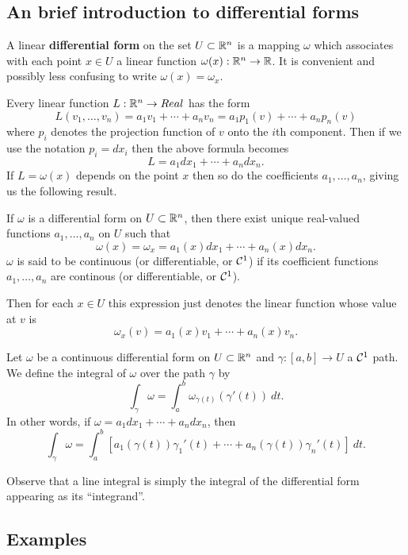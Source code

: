 \subsection{An brief introduction to differential forms}

\begin{definition}
A linear \textbf{differential form} on the set $U \subset \mathbb{R}^n$ is a mapping $\omega$ which associates with each point $x \in U$ a linear function $\omega(x): \mathbb{R}^n \to \mathbb{R}$. It is convenient and possibly less confusing to write $\omega(x) = \omega_x$.
\end{definition}

Every linear function $L: \mathbb{R}^n \to Real$ has the form
\[L(v_1, \dots, v_n) = a_1v_1 + \cdots + a_nv_n = a_1p_1(v) + \cdots + a_np_n(v)\]
where $p_i$ denotes the projection function of $v$ onto the $i$th component. Then if we use the notation $p_i = dx_i$ then the above formula becomes
\[L = a_1dx_1 + \cdots + a_ndx_n.\] If $L = \omega(x)$ depends on the point $x$ then so do the coefficients $a_1, \dots, a_n$, giving us the following result.

\begin{proposition}
If $\omega$ is a differential form on $U \subset \mathbb{R}^n$, then there exist unique real-valued functions $a_1, \dots, a_n$ on $U$ such that 
\[\omega(x) = \omega_x = a_1(x)dx_1 + \cdots + a_n(x)dx_n.\]
$\omega$ is said to be continuous (or differentiable, or $\mathcal{C}^{1}$) if its coefficient functions $a_1, \dots, a_n$ are continous (or differentiable, or $\mathcal{C}^{1}$). 
\end{proposition}

Then for each $x \in U$ this expression just denotes the linear function whose value at $v$ is
\[\omega_x(v) = a_1(x)v_1 + \cdots + a_n(x)v_n.\]

\begin{definition}
Let $\omega$ be a continuous differential form on $U \subset \mathbb{R}^n$ and $\gamma:[a,b] \to U$ a $\mathcal{C}^{1}$ path. We define the integral of $\omega$ over the path $\gamma$ by 
\[\int_{\gamma}\omega = \int_a^b \omega_{\gamma(t)}(\gamma'(t))~dt.\]
In other words, if $\omega = a_1dx_1 + \cdots + a_ndx_n$, then
\[\int_{\gamma}\omega = \int_a^b[a_1(\gamma(t))\gamma_1'(t) + \cdots + a_n(\gamma(t))\gamma_n'(t)]~dt.\]
\end{definition}

Observe that a line integral is simply the integral of the differential form appearing as its ``integrand''.

\subsection{Examples}

